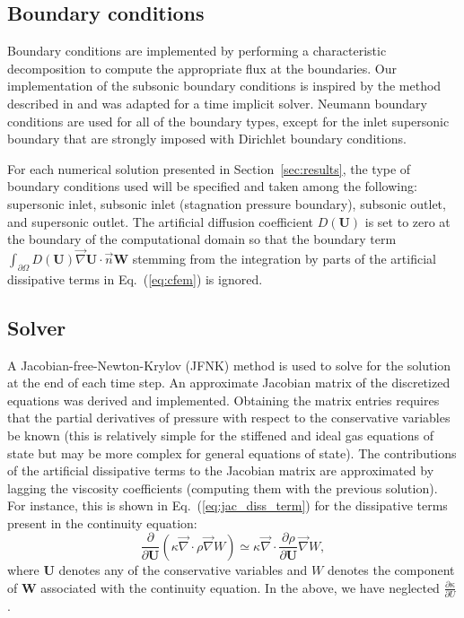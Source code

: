 \documentclass[preprint,10pt]{elsarticle}
\renewcommand{\div}{\vec{\nabla}\! \cdot \!}
\newcommand{\grad}{\vec{\nabla}}
\newcommand{\eqt}[1]{Eq.~(\ref{#1})}                     %
\newcommand{\sct}[1]{Section~\ref{#1}}                   %
\newcommand{\tcr}[1]{\textcolor{red}{#1}}
\newcommand{\tcb}[1]{\textcolor{blue}{#1}}
\begin{document}
\subsection{Boundary conditions} \label{sec:bc}
Boundary conditions are implemented by performing a characteristic decomposition to compute the 
appropriate flux at the boundaries.
Our implementation of the subsonic boundary conditions is inspired by the method described in \cite{SEM} 
and was adapted for a time implicit solver. Neumann boundary conditions are used for all of the 
boundary types, except for the inlet supersonic boundary that are strongly imposed with Dirichlet boundary conditions.

For each numerical solution presented in \sct{sec:results}, the type of boundary conditions used 
will be specified and taken among the following: supersonic inlet, subsonic inlet (stagnation pressure boundary), 
subsonic outlet, and supersonic outlet. 
The artificial diffusion coefficient $D(\mathbf  U)$ is set to zero at the boundary of the computational 
domain so that the boundary term 
$\int_{\partial \Omega} D(\mathbf  U) \grad \mathbf  U \cdot \vec{n} \mathbf W$ stemming from the 
integration by parts of the artificial dissipative terms in \eqt{eq:cfem} is ignored.

\subsection{Solver} \label{sec:solver}
A Jacobian-free-Newton-Krylov (JFNK) method is used to solve for the solution at the end of each time step. 
An approximate Jacobian matrix of the discretized equations was derived and implemented. Obtaining the 
matrix entries requires that the partial derivatives of pressure with respect to the conservative variables 
be known (this is relatively simple for the stiffened and ideal gas equations of state but may be more 
complex for general equations of state). The contributions of the artificial dissipative terms to the 
Jacobian matrix are approximated by lagging the viscosity coefficients (computing them with the previous solution). 
For instance, this is shown in \eqt{eq:jac_diss_term} for the dissipative terms present in the continuity equation:
\begin{equation}
\label{eq:jac_diss_term}
\frac{\partial}{\partial \mathbf U} \left( \kappa \div \rho \grad W \right) \simeq \kappa \div \frac{\partial \rho}{\partial \mathbf U} \grad W ,
\end{equation}  
where $\mathbf  U$ denotes any of the conservative variables and $W$ denotes the component of $\mathbf  W$ associated with the 
continuity equation. In the above, we have neglected $\frac{\partial \kappa}{\partial U}$.
\end{document}
